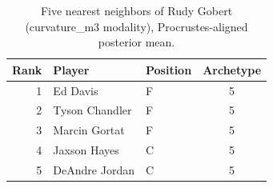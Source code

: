 \begin{table}[htbp]
  \centering\small
  \begin{tabular}{rllc}
    \toprule
    Rank & Player & Position & Archetype \\
    \midrule
    1 & Ed Davis & F & 5 \\
    2 & Tyson Chandler & F & 5 \\
    3 & Marcin Gortat & F & 5 \\
    4 & Jaxson Hayes & C & 5 \\
    5 & DeAndre Jordan & C & 5 \\
    \bottomrule
  \end{tabular}
  \caption{Five nearest neighbors of Rudy Gobert (curvature_m3 modality), Procrustes-aligned posterior mean.}
  \label{tab:Rudy_Gobert_neighbors_curvature_m3}
\end{table}

